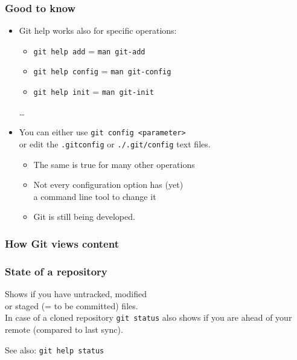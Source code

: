 \documentclass{gittalk}
\newcommand{\hlcommand}[1]{ %
\colorbox{base3}{\small \texttt{#1}}
}
\begin{document}
\begin{frame}
\frametitle{Good to know}
\begin{itemize}
  \item Git help works also for specific operations:
  \begin{itemize}
    \item \hlcommand{git help add} = \hlcommand{man git-add}
    \item \hlcommand{git help config} = \hlcommand{man git-config}
    \item \hlcommand{git help init} = \hlcommand{man git-init}
  \end{itemize}
  \qquad \dots
  \item You can either use \hlcommand{git config <parameter>}\\
        or edit the \hlcommand{.gitconfig} or \hlcommand{./.git/config} text files.\\
        \begin{itemize}
        \item The same is true for many other operations
        \item Not every configuration option has (yet)\\
        a command line tool to change it
        \item Git is still being developed.
        \end{itemize}
\end{itemize}
\end{frame}


\begin{frame}
\frametitle{How Git views content}
\begin{center}
        
\end{center}
\end{frame}

\begin{frame}
\frametitle{State of a repository}
\begin{tcolorbox}[title=git status]
Shows if you have untracked, modified\\ or staged (= to be committed)
files.\\[0.5em]
In case of a cloned repository \hlcommand{git status} also shows if you are
ahead of your remote (compared to last sync).
\end{tcolorbox}
\vspace*{0.5em}
See also: \hlcommand{git help status}
\end{frame}
\end{document}
